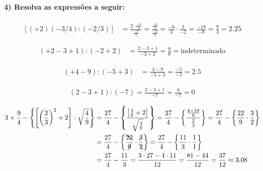 \documentclass[pdftex, brazil, 12pt, oneside]{article}
\begin{document}
\paragraph{4) Resolva as expressões a seguir:}

\begin{equation}
  \begin{split}
    [(+2)(-3/4):(-2/3)] &= \frac{2 \cdot \frac{-3}{4}}{\frac{-2}{3}} = \frac{\frac{-6}{4}}{\frac{-2}{3}} = \frac{-6}{4} \cdot \frac{3}{-2}
    = \frac{-18}{-8} = \frac{9}{4} = 2.25
  \end{split}
\end{equation}

\begin{equation}
  \begin{split}
    (+2-3+1):(-2+2) &= \frac{2-3+1}{-2+2} = \frac{0}{0} = \text{indeterminado}
  \end{split}
\end{equation}

\begin{equation}
  \begin{split}
    (+4-9):(-5+3) &= \frac{4-9}{-5+3} = \frac{-5}{-2} = 2.5
  \end{split}
\end{equation}

\begin{equation}
  \begin{split}
    (2-3+1):(-7) = \frac{2-3+1}{-7} = \frac{0}{-7} = 0
  \end{split}
\end{equation}

\begin{equation}
  \begin{split}
    3 \times \frac{9}{4} - \left\{ \left[ \left(\frac{2}{3}\right)^2 + 2 \right]:\sqrt{\frac{4}{9}} \right\} &=
    \frac{27}{4} - \left\{ \frac{\left[ \frac{4}{9} + 2 \right]}{\sqrt{\frac{4}{9}}} \right\} = \frac{27}{4}-\left\{\frac{\frac{4 + 18}{9}}{\frac{2}{3}} \right\} = \frac{27}{4} - \left\{ \frac{22}{9} \cdot \frac{3}{2} \right\}\\
    &= \frac{27}{4} - \left\{ \frac{\bcancel{22}}{\cancel{9}} \cdot \frac{\cancel{3}}{\bcancel{2}} \right\} =
    \frac{27}{4} - \left\{ \frac{11}{3} \cdot \frac{1}{1} \right\}\\
    &= \frac{27}{4} - \frac{11}{3}  = \frac{3 \cdot 27 - 4 \cdot 11}{12} = \frac{81-44}{12} = \frac{37}{12} \approx 3.08
  \end{split}
\end{equation}
\end{document}
